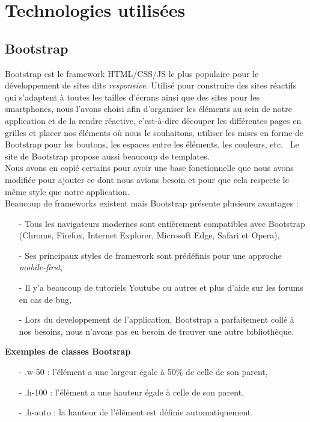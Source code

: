 \documentclass[12pt, french]{article}
\begin{document}
	\section{Technologies utilisées}
		\subsection{Bootstrap}
			Bootstrap \cite{Bootstrap} est le framework HTML/CSS/JS le plus populaire pour le développement de sites dits \textit{responsive}. Utilisé pour construire des sites réactifs qui s'adaptent à toutes les tailles d'écrans ainsi que des sites pour les smartphones, nous l'avons choisi afin d'organiser les éléments au sein de notre application et  de la rendre réactive,
            c'est-à-dire découper les différentes pages en grilles et placer nos éléments où nous le souhaitons,
            utiliser les mises en forme de Bootstrap pour les boutons, les espaces entre les éléments, les couleurs, etc. \ Le site de Bootstrap propose aussi beaucoup de templates. \\ Nous avons en copié certains
			pour avoir une base fonctionnelle que nous avons modifiée pour
			ajouter ce dont nous avions besoin et pour que cela respecte le même
			style que notre application.\newline~~\\
			Beaucoup de frameworks existent mais Bootstrap présente plusieurs avantages : 
			\begin{itemize}
            \item[-]Tous les navigateurs modernes sont entièrement compatibles avec Bootstrap (Chrome, Firefox, Internet Explorer, Microsoft Edge, Safari et Opera),
            \item[-]Ses principaux styles de framework sont prédéfinis pour une approche \textit{mobile-first},
            \item[-]Il y'a beaucoup de  tutoriels Youtube ou autres et plus d'aide sur les forums en cas de bug,
            \item[-] Lors du developpement de l'application, Bootstrap a parfaitement collé à nos besoins, nous n'avons pas eu besoin de trouver une autre bibliothèque.
          \end{itemize}
        
          \textbf{Exemples de classes Bootsrap}
          \begin{itemize}
          \item[-].w-50 : l’élément a une largeur égale à 50\% de celle de son parent,
          \item[-] .h-100 : l’élément a une hauteur égale à celle de son parent,
          \item[-].h-auto : la hauteur de l’élément est définie automatiquement.
          \end{itemize}
          
\end{document}
